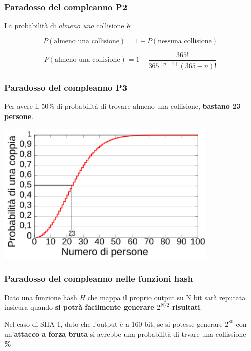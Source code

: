 \begin{frame}
	\frametitle{Paradosso del compleanno P2}

	La probabilità di \textit{almeno una} collisione è:

	\[
		P(\text{almeno una collisione}) = 1 - P(\text{nessuna collisione})
	\]

	\[
		P(\text{almeno una collisione}) = 1 - \frac{365!}{365^(p-1) (365 - n)!}
	\]

\end{frame}


\begin{frame}
	\frametitle{Paradosso del compleanno P3}

	Per avere il 50\% di probabilità di trovare almeno una collisione, \textbf{bastano 23 persone}.

	\begin{center}
		\includegraphics[width=0.8\textwidth]{img/2-img/Birthday_Paradox_IT.png}
	\end{center}

\end{frame}

\begin{frame}
	\frametitle{Paradosso del compleanno nelle funzioni hash}

	Dato una funzione hash \(H\) che mappa il proprio output su N bit sarà reputata insicura quando \textbf{si potrà facilmente generare $2^{N/2}$ risultati}.

	\vspace{1cm}

	Nel caso di SHA-1, dato che l'output è a 160 bit, se si potesse generare $2^{80}$ con un'\textbf{attacco a forza bruta} si avrebbe una probabilità di trvare una collissione \textbf{\%}.
\end{frame}


